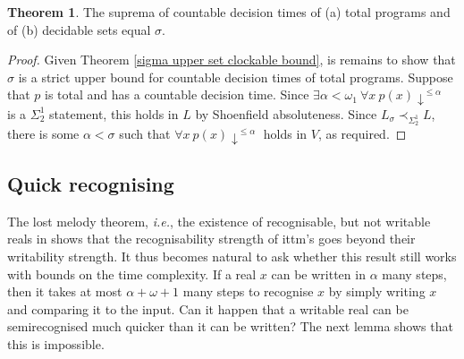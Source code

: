 \documentclass[a4paper,11pt]{amsart}
\theoremstyle{definition}
\newtheorem{theorem}[fact]{Theorem}
\newtheorem*{problem A}{Problem 1}
\newtheorem*{problem B}{Problem 2}
\theoremstyle{remark}
\begin{document}
\begin{theorem}
\label{countable decision times}
The suprema of countable decision times of (a) total programs and of (b) decidable sets equal $\sigma$. 
\end{theorem}
\begin{proof} 
Given Theorem \ref{sigma upper set clockable bound}, is remains to show that $\sigma$ is a strict upper bound for countable decision times of total programs. 
Suppose that $p$ is total and has a countable decision time. 
Since $\exists \alpha<\omega_1\ \forall x\ p(x){\downarrow}^{\leq\alpha}$ is a $\Sigma^1_2$ statement, this holds in $L$ by Shoenfield absoluteness. 
Since $L_\sigma\prec_{\Sigma^1_2} L$, there is some $\alpha<\sigma$ such that $\forall x\ p(x){\downarrow}^{\leq\alpha}$ holds in $V$, as required. 
\end{proof}







\subsection{Quick recognising}
\label{subsection - Quick recognising}  

The lost melody theorem, {\em i.e.}, the existence of recognisable, but not writable reals in \cite[Theorem 4.9]{hamkins2000infinite} shows that the recognisability strength of ittm's goes beyond their writability strength. 
It thus becomes natural to ask whether this result still works with bounds on the time complexity.
If a real $x$ can be written in $\alpha$ many steps, then it takes at most $\alpha+\omega+1$ many steps to recognise $x$ by simply writing $x$ and comparing it to the input. 
Can it happen that a writable real can be semirecognised much quicker than it can be written? 
The next lemma shows that this is impossible. 
\end{document}
